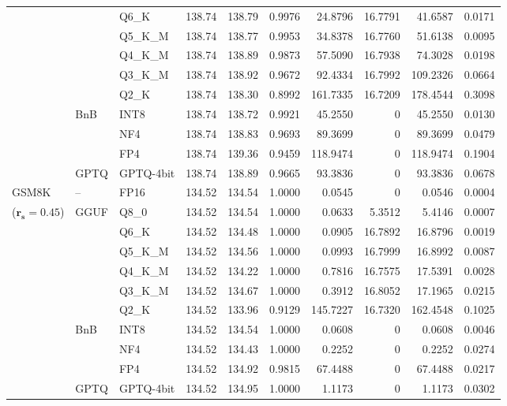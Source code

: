 \begin{longtable}{ll l rrrrrrr}
 &  & Q6\_K & 138.74 & 138.79 & 0.9976 & 24.8796 & 16.7791 & 41.6587 & 0.0171 \\
 &  & Q5\_K\_M & 138.74 & 138.77 & 0.9953 & 34.8378 & 16.7760 & 51.6138 & 0.0095 \\
 &  & Q4\_K\_M & 138.74 & 138.89 & 0.9873 & 57.5090 & 16.7938 & 74.3028 & 0.0198 \\
 &  & Q3\_K\_M & 138.74 & 138.92 & 0.9672 & 92.4334 & 16.7992 & 109.2326 & 0.0664 \\
 &  & Q2\_K & 138.74 & 138.30 & \cellcolor{red!18} 0.8992 & \cellcolor{red!18} 161.7335 & 16.7209 & \cellcolor{red!18} 178.4544 & \cellcolor{red!18} 0.3098 \\
 & BnB & INT8 & 138.74 & 138.72 & 0.9921 & 45.2550 & \cellcolor{cyan!12} $0$ & 45.2550 & 0.0130 \\
 &  & NF4 & 138.74 & 138.83 & 0.9693 & 89.3699 & \cellcolor{cyan!12} $0$ & 89.3699 & 0.0479 \\
 &  & FP4 & 138.74 & 139.36 & \cellcolor{red!18} 0.9459 & \cellcolor{red!18} 118.9474 & \cellcolor{cyan!12} $0$ & \cellcolor{red!18} 118.9474 & \cellcolor{red!18} 0.1904 \\
 & GPTQ & GPTQ-4bit & 138.74 & 138.89 & 0.9665 & 93.3836 & \cellcolor{cyan!12} $0$ & 93.3836 & 0.0678 \\
\midrule
GSM8K & -- & FP16 & 134.52 & 134.54 & 1.0000 & 0.0545 & \cellcolor{cyan!12} $0$ & 0.0546 & 0.0004 \\
{\small ($\mathbf{r_s{=}0.45}$)} & GGUF & Q8\_0 & 134.52 & 134.54 & 1.0000 & 0.0633 & 5.3512 & 5.4146 & 0.0007 \\
 &  & Q6\_K & 134.52 & 134.48 & 1.0000 & 0.0905 & 16.7892 & 16.8796 & 0.0019 \\
 &  & Q5\_K\_M & 134.52 & 134.56 & 1.0000 & 0.0993 & 16.7999 & 16.8992 & 0.0087 \\
 &  & Q4\_K\_M & 134.52 & 134.22 & 1.0000 & 0.7816 & 16.7575 & 17.5391 & 0.0028 \\
 &  & Q3\_K\_M & 134.52 & 134.67 & 1.0000 & 0.3912 & 16.8052 & 17.1965 & 0.0215 \\
 &  & Q2\_K & 134.52 & 133.96 & \cellcolor{red!18} 0.9129 & \cellcolor{red!18} 145.7227 & 16.7320 & \cellcolor{red!18} 162.4548 & \cellcolor{red!18} 0.1025 \\
 & BnB & INT8 & 134.52 & 134.54 & 1.0000 & 0.0608 & \cellcolor{cyan!12} $0$ & 0.0608 & 0.0046 \\
 &  & NF4 & 134.52 & 134.43 & 1.0000 & 0.2252 & \cellcolor{cyan!12} $0$ & 0.2252 & 0.0274 \\
 &  & FP4 & 134.52 & 134.92 & 0.9815 & 67.4488 & \cellcolor{cyan!12} $0$ & 67.4488 & 0.0217 \\
 & GPTQ & GPTQ-4bit & 134.52 & 134.95 & 1.0000 & 1.1173 & \cellcolor{cyan!12} $0$ & 1.1173 & 0.0302 \\
\end{longtable}
\endgroup